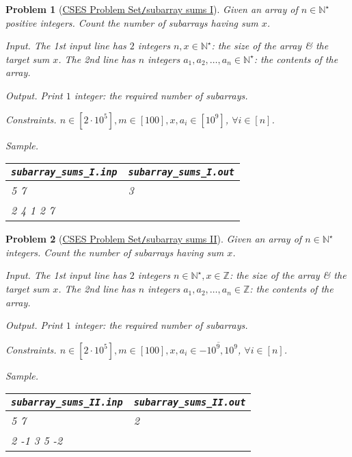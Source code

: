 \documentclass{article}
\newtheorem{problem}{Problem}
\begin{document}
\begin{problem}[\href{https://cses.fi/problemset/task/1660}{CSES Problem Set{\tt/}subarray sums I}]
    Given an array of $n\in\mathbb{N}^\star$ positive integers. Count the number of subarrays having sum $x$.
    \item {\sf Input.} The 1st input line has $2$ integers $n,x\in\mathbb{N}^\star$: the size of the array \& the target sum $x$. The 2nd line has $n$ integers $a_1,a_2,\ldots,a_n\in\mathbb{N}^\star$: the contents of the array.
    \item {\sf Output.} Print $1$ integer: the required number of subarrays.
    \item {\sf Constraints.} $n\in[2\cdot10^5],m\in[100],x,a_i\in[10^9]$, $\forall i\in[n]$.
    \item {\sf Sample.}
    \begin{table}[H]
        \centering
        \begin{tabular}{|l|l|}
            \hline
            \verb|subarray_sums_I.inp| & \verb|subarray_sums_I.out| \\
            \hline
            5 7 & 3 \\
            2 4 1 2 7 & \\
            \hline
        \end{tabular}
    \end{table}
\end{problem}

\begin{problem}[\href{https://cses.fi/problemset/task/1661}{CSES Problem Set{\tt/}subarray sums II}]
    Given an array of $n\in\mathbb{N}^\star$ integers. Count the number of subarrays having sum $x$.
    \item {\sf Input.} The 1st input line has $2$ integers $n\in\mathbb{N}^\star,x\in\mathbb{Z}$: the size of the array \& the target sum $x$. The 2nd line has $n$ integers $a_1,a_2,\ldots,a_n\in\mathbb{Z}$: the contents of the array.
    \item {\sf Output.} Print $1$ integer: the required number of subarrays.
    \item {\sf Constraints.} $n\in[2\cdot10^5],m\in[100],x,a_i\in\overline{-10^9,10^9}$, $\forall i\in[n]$.
    \item {\sf Sample.}
    \begin{table}[H]
        \centering
        \begin{tabular}{|l|l|}
            \hline
            \verb|subarray_sums_II.inp| & \verb|subarray_sums_II.out| \\
            \hline
            5 7 & 2 \\
            2 -1 3 5 -2 & \\
            \hline
        \end{tabular}
    \end{table}
\end{problem}
\end{document}
